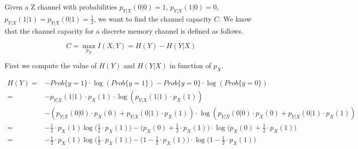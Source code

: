 \documentclass[../main.tex]{subfiles}
\begin{document}
Given a Z channel with probabilities $p_{Y|X}(0|0)=1$, $p_{Y|X}(1|0)=0$, $p_{Y|X}(1|1)=p_{Y|X}(0|1)=\frac{1}{2}$, we want to find the channel capacity $C$. We know that the channel capacity for a discrete memory channel is defined as follows.

\begin{equation}
	C = \max_{p_X} I(X;Y) = H(Y)-H(Y|X)
\end{equation}

First we compute the value of $H(Y)$ and $H(Y|X)$ in function of $p_X$.

\begin{align*}
	H(Y)= & -Prob\{y=1\}\cdot\log(Prob\{y=1\})-Prob\{y=0\}\cdot\log(Prob\{y=0\}) \\
	= & -p_{Y|X}(1|1) \cdot p_X(1) \cdot\log(p_{Y|X}(1|1) \cdot p_X(1)) \\ & -(p_{Y|X}(0|0) \cdot p_X(0) + p_{Y|X}(0|1) \cdot p_X(1)) \cdot\log(p_{Y|X}(0|0) \cdot p_X(0) + p_{Y|X}(0|1) \cdot p_X(1)) \\
	= & -\frac{1}{2}\cdot p_X(1)\log\Big(\frac{1}{2}\cdot p_X(1)\Big)-\Big(p_X(0)+\frac{1}{2}\cdot p_X(1)\Big)\cdot \log \Big(p_X(0)+\frac{1}{2}\cdot p_X(1)\Big) \\
	= & -\frac{1}{2}\cdot p_X(1)\log\Big(\frac{1}{2}\cdot p_X(1)\Big)-\Big(1-\frac{1}{2}\cdot p_X(1)\Big)\cdot \log \Big(1-\frac{1}{2}\cdot p_X(1)\Big) 
\end{align*}
\end{document}

